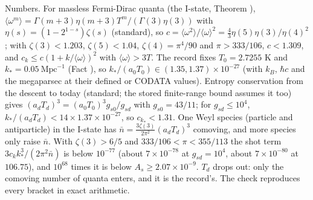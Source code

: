 Numbers. For massless Fermi-Dirac quanta (the I-state, Theorem ), $\langle\omega^{m}\rangle = \Gamma(m + 3)\eta(m + 3)T^{m}/(\Gamma(3)\eta(3))$ with $\eta(s) = (1 - 2^{1 - s})\zeta(s)$ (standard), so $c = \langle\omega^{2}\rangle/\langle\omega\rangle^{2} = \tfrac43\eta(5)\eta(3)/\eta(4)^{2}$; with $\zeta(3) < 1.203$, $\zeta(5) < 1.04$, $\zeta(4) = \pi^{4}/90$ and $\pi > 333/106$, $c < 1.309$, and $c_{k} \le c(1 + k/\langle\omega\rangle)^{2}$ with $\langle\omega\rangle > 3T$. The record fixes $T_{0} = 2.7255$ K and $k_{*} = 0.05\ \mathrm{Mpc}^{-1}$ (Fact ), so $k_{*}/(a_{0}T_{0}) \in (1.35, 1.37) \times 10^{-27}$ (with $k_{B}$, $\hbar c$ and the megaparsec at their defined or CODATA values). Entropy conservation from the descent to today (standard; the stored finite-range bound assumes it too) gives $(a_{d}T_{d})^{3} = (a_{0}T_{0})^{3}g_{s0}/g_{sd}$ with $g_{s0} = 43/11$; for $g_{sd} \le 10^{4}$, $k_{*}/(a_{d}T_{d}) < 14 \times 1.37 \times 10^{-27}$, so $c_{k_{*}} < 1.31$. One Weyl species (particle and antiparticle) in the I-state has $\bar n = \tfrac{3\zeta(3)}{2\pi^{2}}(a_{d}T_{d})^{3}$ comoving, and more species only raise $\bar n$. With $\zeta(3) > 6/5$ and $333/106 < \pi < 355/113$ the shot term $3c_{k}k_{*}^{3}/(2\pi^{2}\bar n)$ is below $10^{-77}$ (about $7 \times 10^{-78}$ at $g_{sd} = 10^{4}$, about $7 \times 10^{-80}$ at $106.75$), and $10^{68}$ times it is below $A_{s} \ge 2.07 \times 10^{-9}$. $T_{d}$ drops out: only the comoving number of quanta enters, and it is the record's. The check reproduces every bracket in exact arithmetic.

